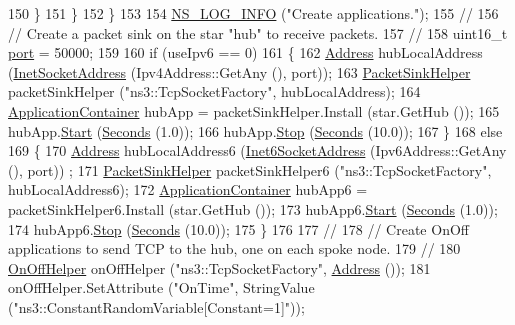 \begin{DoxyCode}
150             \}
151         \}
152     \}
153 
154   \hyperlink{group__logging_gafbd73ee2cf9f26b319f49086d8e860fb}{NS\_LOG\_INFO} (\textcolor{stringliteral}{"Create applications."});
155   \textcolor{comment}{//}
156   \textcolor{comment}{// Create a packet sink on the star "hub" to receive packets.}
157   \textcolor{comment}{// }
158   uint16\_t \hyperlink{dsdv-manet_8cc_a8e0798404bf2cf5dabb84c5ba9a4f236}{port} = 50000;
159 
160   \textcolor{keywordflow}{if} (useIpv6 == 0)
161     \{
162       \hyperlink{classns3_1_1Address}{Address} hubLocalAddress (\hyperlink{classns3_1_1InetSocketAddress}{InetSocketAddress} (Ipv4Address::GetAny (), port));
163       \hyperlink{classns3_1_1PacketSinkHelper}{PacketSinkHelper} packetSinkHelper (\textcolor{stringliteral}{"ns3::TcpSocketFactory"}, hubLocalAddress);
164       \hyperlink{classns3_1_1ApplicationContainer}{ApplicationContainer} hubApp = packetSinkHelper.Install (star.GetHub ());
165       hubApp.\hyperlink{classns3_1_1ApplicationContainer_a8eff87926507020bbe3e1390358a54a7}{Start} (\hyperlink{group__timecivil_ga33c34b816f8ff6628e33d5c8e9713b9e}{Seconds} (1.0));
166       hubApp.\hyperlink{classns3_1_1ApplicationContainer_adfc52f9aa4020c8714679b00bbb9ddb3}{Stop} (\hyperlink{group__timecivil_ga33c34b816f8ff6628e33d5c8e9713b9e}{Seconds} (10.0));
167     \}
168   \textcolor{keywordflow}{else} 
169     \{
170       \hyperlink{classns3_1_1Address}{Address} hubLocalAddress6 (\hyperlink{classns3_1_1Inet6SocketAddress}{Inet6SocketAddress} (Ipv6Address::GetAny (), port))
      ;
171       \hyperlink{classns3_1_1PacketSinkHelper}{PacketSinkHelper} packetSinkHelper6 (\textcolor{stringliteral}{"ns3::TcpSocketFactory"}, hubLocalAddress6);
172       \hyperlink{classns3_1_1ApplicationContainer}{ApplicationContainer} hubApp6 = packetSinkHelper6.Install (star.GetHub ());
173       hubApp6.\hyperlink{classns3_1_1ApplicationContainer_a8eff87926507020bbe3e1390358a54a7}{Start} (\hyperlink{group__timecivil_ga33c34b816f8ff6628e33d5c8e9713b9e}{Seconds} (1.0));
174       hubApp6.\hyperlink{classns3_1_1ApplicationContainer_adfc52f9aa4020c8714679b00bbb9ddb3}{Stop} (\hyperlink{group__timecivil_ga33c34b816f8ff6628e33d5c8e9713b9e}{Seconds} (10.0));
175     \}
176 
177   \textcolor{comment}{//}
178   \textcolor{comment}{// Create OnOff applications to send TCP to the hub, one on each spoke node.}
179   \textcolor{comment}{//}
180   \hyperlink{classns3_1_1OnOffHelper}{OnOffHelper} onOffHelper (\textcolor{stringliteral}{"ns3::TcpSocketFactory"}, \hyperlink{classns3_1_1Address}{Address} ());
181   onOffHelper.SetAttribute (\textcolor{stringliteral}{"OnTime"}, StringValue (\textcolor{stringliteral}{"ns3::ConstantRandomVariable[Constant=1]"}));

\end{DoxyCode}
